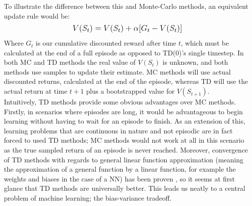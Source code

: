 \documentclass[12pt]{article}
\begin{document}
To illustrate the difference between this and Monte-Carlo methods, an equivalent update rule would be:
\begin{equation}
    \mathlarger{
        V(S_t) = V(S_t) + \alpha[G_t - V(S_t)]
    }
\end{equation}
Where $G_t$ is our cumulative discounted reward after time $t$, which must be calculated at the end of a full episode as opposed to TD(0)'s single timestep. In both MC and TD methods the real value of $V(S_t)$ is unknown, and both methods use samples to update their estimate. MC methods will use actual discounted returns, calculated at the end of the episode, whereas TD will use the actual return at time $t+1$ plus a bootstrapped value for $V(S_{t+1})$.
\\\newline Intuitively, TD methods provide some obvious advantages over MC methods. Firstly, in scenarios where episodes are long, it would be advantageous to begin learning without having to wait for an episode to finish. As an extension of this, learning problems that are continuous in nature and not episodic are in fact forced to used TD methods; MC methods would not work at all in this scenario as the true sampled return of an episode is never reached. Moreover, convergence of TD methods with regards to general linear function approximation (meaning the approximation of a general function by a linear function, for example the weights and biases in the case of a NN) has been proven \autocite{tadic2001convergence,sutton2008convergent}, so it seems at first glance that TD methods are universally better.
This leads us neatly to a central problem of machine learning; the bias-variance tradeoff.
\end{document}
